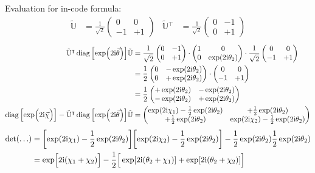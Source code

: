 \documentclass[
	english,
	a4paper,
	fontsize=10pt,
	parskip=half,
	titlepage=true,
	DIV=12,
	final
]{scrreprt}
\newcommand*{\transp}{\ensuremath{^\intercal}}
\newcommand*{\iunit}{\ensuremath{\mathrm{i}}}
\DeclareMathOperator{\diag}{diag}
\begin{document}
Evaluation for in-code formula:
\begin{align*}
	\tilde{\mathbb{U}}
&=
	\frac{1}{\sqrt{2}}
	\begin{pmatrix}
		 0 &  0 \\
		-1 & +1
	\end{pmatrix}
&
	\tilde{\mathbb{U}}\transp
&=
	\frac{1}{\sqrt{2}}
	\begin{pmatrix}
		0 & -1 \\
		0 & +1
	\end{pmatrix}
\end{align*}
\begin{align*}
	\tilde{\mathbb{U}}\transp
	\diag\qty[\exp(2\iunit\vec{\theta})]
	\tilde{\mathbb{U}}
&=
	\frac{1}{\sqrt{2}}
	\begin{pmatrix}
		0 & -1 \\
		0 & +1
	\end{pmatrix}
	\cdot
	\begin{pmatrix}
		1 & 0 \\
		0 & \exp(2\iunit \theta_2)
	\end{pmatrix}
	\cdot
	\frac{1}{\sqrt{2}}
	\begin{pmatrix}
		 0 &  0 \\
		-1 & +1
	\end{pmatrix} \\
&=
	\frac{1}{2}
	\begin{pmatrix}
		0 & -\exp(2\iunit \theta_2) \\
		0 & +\exp(2\iunit \theta_2)
	\end{pmatrix}
	\cdot
	\begin{pmatrix}
		 0 &  0 \\
		-1 & +1
	\end{pmatrix} \\
&=
	\frac{1}{2}
	\begin{pmatrix}
		+\exp(2\iunit \theta_2)	&	-\exp(2\iunit \theta_2) \\
		-\exp(2\iunit \theta_2)	&	+\exp(2\iunit \theta_2)
	\end{pmatrix}
\\
	\diag\qty[\exp(\Big.2\iunit\vec{\chi})]
	-
	\tilde{\mathbb{U}}\transp
	\diag\qty[\exp(2\iunit\vec{\theta})]
	\tilde{\mathbb{U}}
&=
	\begin{pmatrix}
		\exp(2\iunit \chi_1) - \frac{1}{2}\exp(2\iunit \theta_2)	&
		+\frac{1}{2}\exp(2\iunit \theta_2)
		\\
		+\frac{1}{2}\exp(2\iunit \theta_2)	&
		\exp(2\iunit \chi_2) - \frac{1}{2}\exp(2\iunit \theta_2)
	\end{pmatrix}
\end{align*}
\begin{align*}
	\det(\ldots)
&=
	\qty[ \exp(2\iunit \chi_1) - \frac{1}{2}\exp(2\iunit \theta_2) ]
	\qty[ \exp(2\iunit \chi_2) - \frac{1}{2}\exp(2\iunit \theta_2) ]
	-
	\frac{1}{2}\exp(2\iunit \theta_2)
	\frac{1}{2}\exp(2\iunit \theta_2) \\
&=
	\exp[ \Big. 2\iunit (\chi_1 + \chi_2) ]
	-\frac{1}{2} \qty[ \Big.
		\exp[2\iunit (\theta_2 + \chi_1)] +
		\exp[2\iunit (\theta_2 + \chi_2)]
	]
\end{align*}
\end{document}
